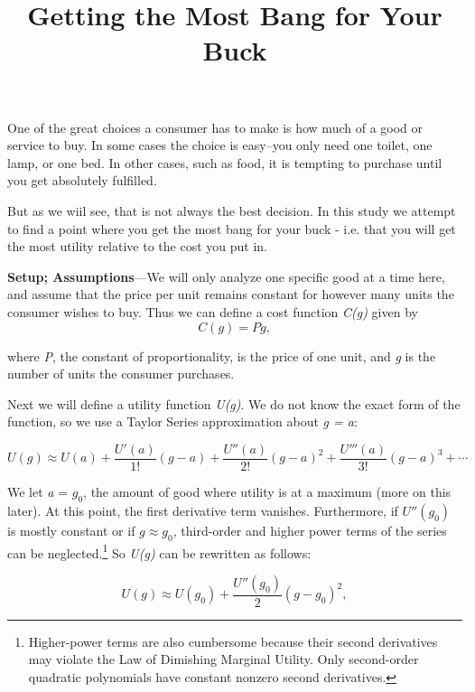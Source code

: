\documentclass[11pt]{article}
\title{Getting the Most Bang for Your Buck}
\author{}
\date{}
\begin{document}
  \maketitle 
  
  One of the great choices a consumer has to make is how much of a good or service to buy. In some cases the choice is easy--you only need one toilet, one lamp, or one bed. In other cases, such as food, it is tempting to purchase until you get absolutely fulfilled.
  
  But as we wiil see, that is not always the best decision. In this study we attempt to find a point where you get the most bang for your buck - i.e. that you will get the most utility relative to the cost you put in.

\vspace{16pt}
\textbf{Setup; Assumptions}---We will only analyze one specific good at a time here, and assume that the price per unit remains constant for however many units the consumer wishes to buy. Thus we can define a cost function \textit{C(g)} given by
\begin{equation}
	C(g) = Pg,
\end{equation}

where \textit{P}, the constant of proportionality, is the price of one unit, and \textit{g} is the number of units the consumer purchases.

Next we will define a utility function \textit{U(g)}. We do not know the exact form of the function, so we use a Taylor Series approximation about \textit{g = a}:

\begin{equation}
	U(g) \approx U(a) + \frac{U'(a)}{1!} (g - a) + \frac{U''(a)}{2!}(g - a)^2 + \frac{U'''(a)}{3!}(g-a)^3 + \cdots
\end{equation}

We let \textit{a} = $g_0$, the amount of good where utility is at a maximum (more on this later). At this point, the first derivative term vanishes. Furthermore, if $U''(g_0)$ is mostly constant or if $g \approx g_0$, third-order and higher power terms of the series can be neglected.\footnote{Higher-power terms are also cumbersome because their second derivatives may violate the Law of Dimishing Marginal Utility. Only second-order quadratic polynomials have constant nonzero second derivatives.} So \textit{U(g)} can be rewritten as follows:

\begin{equation}
	U(g) \approx U(g_0) + \frac{U''(g_0)}{2}(g - g_0)^2,
\end{equation}
\end{document}

